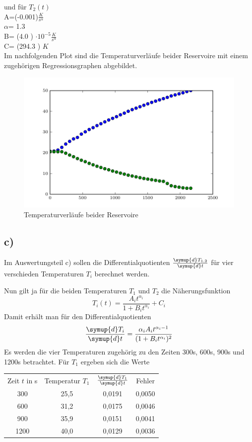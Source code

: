 und für $T_2(t)$\\

A=(-0.001)$\frac{K}{s^\alpha}$ \\
$\alpha$= 1.3  \\
B= (4.0 ) $\cdot 10^{-5}\frac{K}{s^\alpha}$\\
C= (294.3 ) $K$ \\

Im nachfolgenden Plot sind die Temperaturverläufe beider Reservoire mit einem zugehörigen Regressionsgraphen abgebildet.

\begin{figure}
  \centering
  \includegraphics{build/plot.pdf}
  \caption{Temperaturverläufe beider Reservoire}
  \label{fig:temperaturverlauf}
\end{figure}


\subsection{c)}
Im Auswertungsteil c) sollen die Differentialquotienten $\frac{\symup{d}T_{1,2}}{\symup{d}t}$
für vier verschieden Temperaturen $T_i$ berechnet werden.

Nun gilt ja für die beiden Temperaturen $T_1$ und $T_2$ die Näherungsfunktion
\begin{equation}
	T_i(t) = \frac{A_i t^{\alpha_i}}{1 + B_i t^{\alpha_i}} + C_i
\end{equation}
Damit erhält man für den Differentialquotienten
\begin{equation}
	\frac{\symup{d}T_i}{\symup{d}t} = \frac{\alpha_i A_i t^{\alpha_i - 1}}{(1 + B_i t^{\alpha_i})^2}
\end{equation}
Es werden die vier Temperaturen zugehörig zu den Zeiten 300s, 600s, 900s und 1200s betrachtet.
Für $T_1$ ergeben sich die Werte
\begin{table}
\begin{tabular}{cccc}
	Zeit $t$ in s & Temperatur $T_1$ & $\frac{\symup{d}T_1}{\symup{d}t}$ & Fehler \\
	300 & 25,5 & 0,0191 & 0,0050 \\
	600 & 31,2 & 0,0175 & 0,0046 \\
	900 & 35,9 & 0,0151 & 0,0041 \\
	1200 & 40,0 & 0,0129 & 0,0036 \\
\end{tabular}
\end{table}


